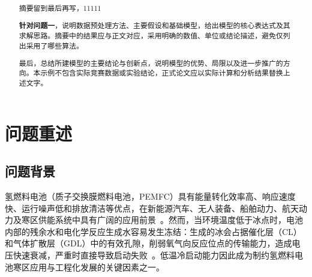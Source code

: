\documentclass{gmcmthesis}
\title{\underline{\makebox[300bp][c]{研究生数学建模竞赛论文题目}}}
\begin{document}
\makecover
\maketitle

\begin{abstract}
摘要留到最后再写，11111

\textbf{针对问题一}，说明数据预处理方法、主要假设和基础模型，给出模型的核心表达式及其求解思路。摘要中的结果应与正文对应，采用明确的数值、单位或结论描述，避免仅列出采用了哪些算法。

最后，总结所建模型的主要结论与创新点，说明模型的优势、局限以及进一步推广的方向。本示例不包含实际竞赛数据或实验结论，正式论文应以实际计算和分析结果替换上述文字。
\end{abstract}

\tableofcontents

\section{问题重述}
\label{sec:problem}

\subsection{问题背景}
氢燃料电池（质子交换膜燃料电池，PEMFC）具有能量转化效率高、响应速度快、运行噪声低和排放清洁等优点，在新能源汽车、无人装备、船舶动力、航天动力及寒区供能系统中具有广阔的应用前景~\cite{huang2021lowtemp}。然而，当环境温度低于冰点时，电池内部的残余水和电化学反应生成水容易发生冻结：生成的冰会占据催化层（CL）和气体扩散层（GDL）中的有效孔隙，削弱氧气向反应位点的传输能力，造成电压快速衰减，严重时直接导致启动失败~\cite{luo2018coldstart}。低温冷启动能力因此成为制约氢燃料电池寒区应用与工程化发展的关键因素之一。
\end{document}

